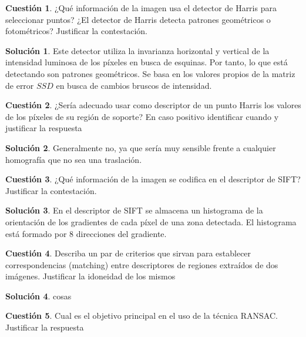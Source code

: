 \documentclass[a4paper, 11pt]{article}
\theoremstyle{definition}
\newtheorem{cuestion}{Cuestión}
\newtheorem*{solucion}{Solución}
\begin{document}
  \begin{cuestion}
    ¿Qué información de la imagen usa el detector de Harris para seleccionar
    puntos? ¿El detector de Harris detecta patrones geométricos o fotométricos?
    Justificar la contestación.
  \end{cuestion}

  \begin{solucion}
     	Este detector utiliza la invarianza horizontal y vertical de la intensidad
      luminosa de los píxeles en busca de esquinas. Por tanto, lo que está detectando son patrones
      geométricos. Se basa en los valores propios de la matriz de error $SSD$ en busca
      de cambios bruscos de intensidad.
  \end{solucion}
  \begin{cuestion}
    ¿Sería adecuado usar como descriptor de un punto Harris los valores de
    los píxeles de su región de soporte? En caso positivo identificar cuando y
    justificar la respuesta
  \end{cuestion}

  \begin{solucion}
     	Generalmente no, ya que sería muy sensible frente a cualquier homografía
      que no sea una traslación.
  \end{solucion}
  \begin{cuestion}
    ¿Qué información de la imagen se codifica en el descriptor de SIFT?
    Justificar la contestación.
  \end{cuestion}

  \begin{solucion}
     	En el descriptor de SIFT se almacena un histograma de la orientación de los
      gradientes de cada píxel de una zona detectada. El histograma está formado
      por 8 direcciones del gradiente.
  \end{solucion}

  \begin{cuestion}
    Describa un par de criterios que sirvan para establecer correspondencias
    (matching) entre descriptores de regiones extraídos de dos imágenes. Justificar
    la idoneidad de los mismos
  \end{cuestion}

  \begin{solucion}
     	cosas
  \end{solucion}

  \begin{cuestion}
    Cual es el objetivo principal en el uso de la técnica RANSAC. Justificar
    la respuesta
  \end{cuestion}
\end{document}
